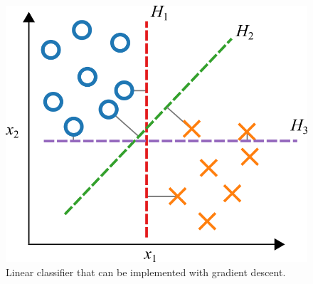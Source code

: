 \documentclass[12pt,letter]{article}
\begin{document}
\begin{figure}[H]
    \centering
    \includegraphics[]{../figures/x_y_plot_linear_classifier}
    \caption{Linear classifier that can be implemented with gradient descent.}
    \label{fig:x_y_plot_linear_classifier}
\end{figure}

\pagebreak
\end{document}
